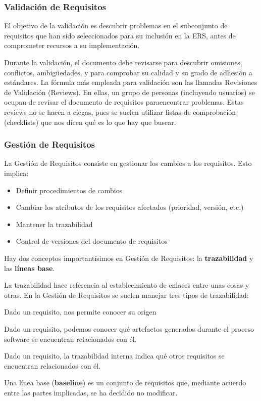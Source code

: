 \subsubsection{Validación de Requisitos}
\label{sec:requisitos:validacion}

El objetivo de la validación es descubrir problemas en el subconjunto
de requisitos que han sido seleccionados para su inclusión en la ERS,
antes de comprometer recursos a su implementación.

Durante la validación, el documento debe revisarse para descubrir
omisiones, conflictos, ambigüedades, y para comprobar su calidad y su
grado de adhesión a estándares. La fórmula más empleada para
validación son las llamadas Revisiones de Validación (Reviews). En
ellas, un grupo de personas (incluyendo usuarios) se ocupan de revisar
el documento de requisitos paraencontrar problemas. Estas reviews no
se hacen a ciegas, pues se suelen utilizar listas de comprobación
(checklists) que nos dicen qué es lo que hay que buscar.

\subsubsection{Gestión de Requisitos}
\label{sec:requisitos:gestion}

La Gestión de Requisitos consiste en gestionar los cambios a los
requisitos. Esto implica:

\begin{itemize}[noitemsep]
\item Definir procedimientos de cambios
\item Cambiar los atributos de los requisitos afectados (prioridad, versión, etc.)
\item Mantener la trazabilidad
\item Control de versiones del documento de requisitos
\end{itemize}

Hay dos conceptos importantísimos en Gestión de Requisitos: la \textbf{trazabilidad} y las \textbf{líneas base}.

La trazabilidad hace referencia al establecimiento de enlaces entre
unas cosas y otras. En la Gestión de Requisitos se suelen manejar tres
tipos de trazabilidad:

\begin{description}[noitemsep]
\item [Trazabilidad hacia atrás] Dado un requisito, nos permite conocer
  su origen
\item [Trazabilidad hacia delante] Dado un requisito, podemos conocer
  qué artefactos generados durante el proceso software se encuentran
  relacionados con él.
\item [Trazabilidad interna] Dado un requisito, la trazabilidad interna
  indica qué otros requisitos se encuentran relacionados con él.
\end{description}

Una línea base (\textbf{baseline}) es un conjunto de requisitos que, mediante acuerdo entre las partes
implicadas, se ha decidido no modificar.